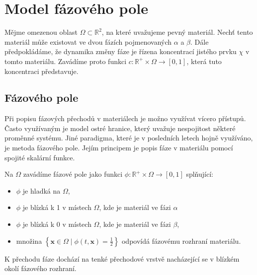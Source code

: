 \chapter{Model fázového pole}
Mějme omezenou oblast \(\Omega \subset \mathbb{R}^2\), na které uvažujeme pevný materiál.
Nechť tento materiál může existovat ve dvou fázích pojmenovaných \(\alpha\) a \(\beta\).
Dále předpokládáme, že dynamika změny fáze je řízena koncentrací jistého prvku \(\chi\) v tomto materiálu.
Zavádíme proto funkci \(c: \mathbb{R}^+ \times \Omega \to [0, 1]\), která tuto koncentraci představuje.

\section{Fázového pole}\label{Sekce: Fázové pole}
Při popisu fázových přechodů v materiálech je možno využívat vícero přístupů.
Často využívaným je model ostré hranice, který uvažuje nespojitost některé proměnné systému. %
Jiné paradigma, které je v posledních letech hojně využíváno, je metoda fázového pole.
Jejím principem je popis fáze v materiálu pomocí spojité skalární funkce.

\begin{definice}
    Na \(\Omega\) zavádíme fázové pole jako funkci \(\phi: \mathbb{R}^{+} \times \Omega \to [0, 1]\) splňující:
    \begin{itemize}
        \item \(\phi\) je hladká na \(\Omega\),
        \item \(\phi\) je blízká k 1 v místech \(\Omega\), kde je materiál ve fázi \(\alpha\)
        \item \(\phi\) je blízká k 0 v místech \(\Omega\), kde je materiál ve fázi \(\beta\), %
        \item množina \(\left\{ \mathbf{x} \in \Omega \mid \phi(t, \mathbf{x}) = \tfrac{1}{2}\right\}\) odpovídá fázovému rozhraní materiálu.
    \end{itemize}
\end{definice}

K přechodu fáze dochází na tenké přechodové vrstvě nacházející se v blízkém okolí fázového rozhraní.

